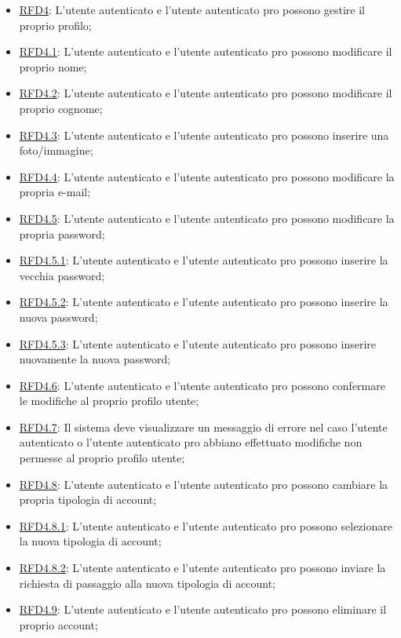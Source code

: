 \begin{itemize}
\item \hyperlink{RFD4}{RFD4}: L’utente autenticato e l’utente
autenticato pro possono gestire il proprio
profilo;
\item \hyperlink{RFD4.1}{RFD4.1}: L’utente autenticato e l’utente
autenticato pro possono modificare il
proprio nome;
\item \hyperlink{RFD4.2}{RFD4.2}: L’utente autenticato e l’utente
autenticato pro possono modificare il
proprio cognome;
\item \hyperlink{RFD4.3}{RFD4.3}: L’utente autenticato e l’utente
autenticato pro possono inserire una
foto/immagine;
\item \hyperlink{RFD4.4}{RFD4.4}: L’utente autenticato e l’utente
autenticato pro possono modificare la
propria e-mail;
\item \hyperlink{RFD4.5}{RFD4.5}: L’utente autenticato e l’utente
autenticato pro possono modificare la
propria password;
\item \hyperlink{RFD4.5.1}{RFD4.5.1}: L’utente autenticato e l’utente
autenticato pro possono inserire la vecchia password;
\item \hyperlink{RFD4.5.2}{RFD4.5.2}: L’utente autenticato e l’utente
autenticato pro possono inserire la nuova password;
\item \hyperlink{RFD4.5.3}{RFD4.5.3}: L’utente autenticato e l’utente
autenticato pro possono inserire nuovamente la nuova password;
\item \hyperlink{RFD4.6}{RFD4.6}: L’utente autenticato e l’utente
autenticato pro possono confermare le
modifiche al proprio profilo utente;
\item \hyperlink{RFD4.7}{RFD4.7}: Il sistema deve visualizzare un messaggio
di errore nel caso l’utente autenticato o
l’utente autenticato pro abbiano effettuato modifiche
non permesse al proprio profilo utente;
\item \hyperlink{RFD4.8}{RFD4.8}: L’utente autenticato e l’utente
autenticato pro possono cambiare la
propria tipologia di account;
\item \hyperlink{RFD4.8.1}{RFD4.8.1}: L’utente autenticato e l’utente
autenticato pro possono selezionare la nuova tipologia di account;
\item \hyperlink{RFD4.8.2}{RFD4.8.2}: L’utente autenticato e l’utente autenticato pro possono inviare la richiesta di passaggio alla nuova tipologia di account;
\item \hyperlink{RFD4.9}{RFD4.9}: L’utente autenticato e l’utente autenticato pro possono eliminare il proprio account;

\end{itemize}
